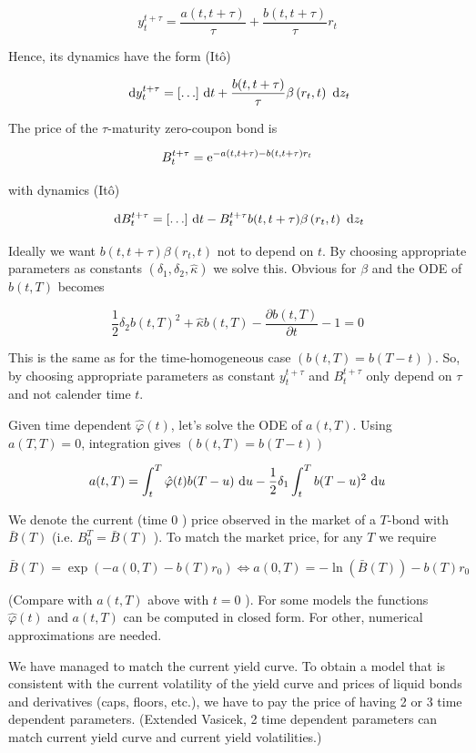 $$
y_{t}^{t+\tau}=\frac{a(t, t+\tau)}{\tau}+\frac{b(t, t+\tau)}{\tau} r_{t}
$$

Hence, its dynamics have the form (Itô)

$$
\text{ d}  y_{t}^{t+\tau}=[\ldots] \text{ d}  t+\frac{b(t, t+\tau)}{\tau} \beta\left(r_{t}, t\right) \text{ d}  z_{t}
$$

The price of the $\tau$-maturity zero-coupon bond is

$$
B_{t}^{t+\tau}=\mathrm{e}^{-a(t, t+\tau)-b(t, t+\tau) r_{t}}
$$

with dynamics (Itô)

$$
\text{ d}  B_{t}^{t+\tau}=[\ldots] \text{ d}  t-B_{t}^{t+\tau} b(t, t+\tau) \beta\left(r_{t}, t\right) \text{ d}  z_{t}
$$

Ideally we want $b(t, t+\tau) \beta\left(r_{t}, t\right)$ not to depend on $t$. By choosing appropriate parameters as constants $\left(\delta_{1}, \delta_{2}, \hat{\kappa}\right)$ we solve this. Obvious for $\beta$ and the ODE of $b(t, T)$ becomes

$$
\frac{1}{2} \delta_{2} b(t, T)^{2}+\hat{\kappa} b(t, T)-\frac{\partial b(t, T)}{\partial t}-1=0
$$

This is the same as for the time-homogeneous case $(b(t, T)=b(T-t))$. So, by choosing appropriate parameters as constant $y_{t}^{t+\tau}$ and $B_{t}^{t+\tau}$ only depend on $\tau$ and not calender time $t$.

Given time dependent $\hat{\varphi}(t)$, let's solve the ODE of $a(t, T)$. Using $a(T, T)=0$, integration gives $(b(t, T)=b(T-t))$

$$
a(t, T)=\int_{t}^{T} \hat{\varphi}(t) b(T-u) \text{ d}  u-\frac{1}{2} \delta_{1} \int_{t}^{T} b(T-u)^{2} \text{ d}  u
$$

We denote the current (time 0 ) price observed in the market of a $T$-bond with $\bar{B}(T)$ (i.e. $B_{0}^{T}=\bar{B}(T)$ ). To match the market price, for any $T$ we require

$$
\bar{B}(T)=\exp \left(-a(0, T)-b(T) r_{0}\right) \Longleftrightarrow a(0, T)=-\ln (\bar{B}(T))-b(T) r_{0}
$$

(Compare with $a(t, T)$ above with $t=0$ ). For some models the functions $\hat{\varphi}(t)$ and $a(t, T)$ can be computed in closed form. For other, numerical approximations are needed.

We have managed to match the current yield curve. To obtain a model that is consistent with the current volatility of the yield curve and prices of liquid bonds and derivatives (caps, floors, etc.), we have to pay the price of having 2 or 3 time dependent parameters. (Extended Vasicek, 2 time dependent parameters can match current yield curve and current yield volatilities.)

